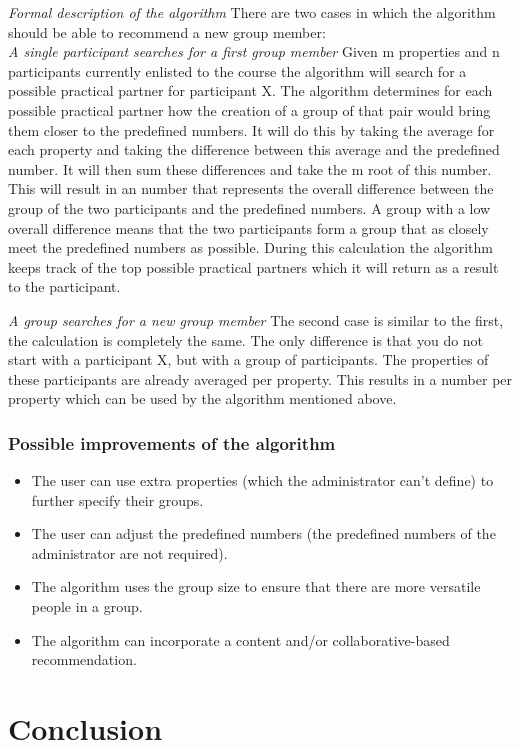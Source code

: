 \documentclass[]{article}
\begin{document}
\emph{Formal description of the algorithm}
There are two cases in which the algorithm should be able to recommend a new group member:\\
\emph{A single participant searches for a first group member}
Given m properties and n participants currently enlisted to the course the algorithm will search for a possible practical partner for participant X.
The algorithm determines for each possible practical partner how the creation of a group of that pair would bring them closer to the predefined numbers.
It will do this by taking the average for each property and taking the difference between this average and the predefined number.
It will then sum these differences and take the m root of this number.
This will result in an number that represents the overall difference between the group of the two participants and the predefined numbers.
A group with a low overall difference means that the two participants form a group that as closely meet the predefined numbers as possible.
During this calculation the algorithm keeps track of the top possible practical partners which it will return as a result to the participant.

\emph{A group searches for a new group member}
The second case is similar to the first, the calculation is completely the same.
The only difference is that you do not start with a participant X, but with a group of participants.
The properties of these participants are already averaged per property.
This results in a number per property which can be used by the algorithm mentioned above.

\subsubsection{Possible improvements of the algorithm}
\begin{itemize}
\item The user can use extra properties (which the administrator can't define) to further specify their groups.
\item The user can adjust the predefined numbers (the predefined numbers of the administrator are not required).
\item The algorithm uses the group size to ensure that there are more versatile people in a group.
\item The algorithm can incorporate a content and/or collaborative-based recommendation.
\end{itemize}

\section{Conclusion}

\newpage


\end{document}
